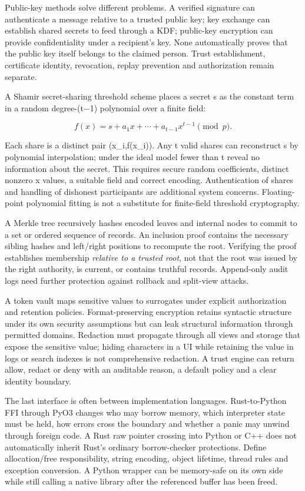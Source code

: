 Public-key methods solve different problems. A verified signature can authenticate a message relative to a trusted public key; key exchange can establish shared secrets to feed through a KDF; public-key encryption can provide confidentiality under a recipient's key. None automatically proves that the public key itself belongs to the claimed person. Trust establishment, certificate identity, revocation, replay prevention and authorization remain separate.

A Shamir secret-sharing threshold scheme places a secret s as the constant term in a random degree-(t−1) polynomial over a finite field:

\[
f(x)=s+a_1x+\cdots+a_{t-1}x^{t-1}\pmod p.
\]

Each share is a distinct pair (x\_i,f(x\_i)). Any t valid shares can reconstruct s by polynomial interpolation; under the ideal model fewer than t reveal no information about the secret. This requires secure random coefficients, distinct nonzero x values, a suitable field and correct encoding. Authentication of shares and handling of dishonest participants are additional system concerns. Floating-point polynomial fitting is not a substitute for finite-field threshold cryptography.

A Merkle tree recursively hashes encoded leaves and internal nodes to commit to a set or ordered sequence of records. An inclusion proof contains the necessary sibling hashes and left/right positions to recompute the root. Verifying the proof establishes membership \emph{relative to a trusted root}, not that the root was issued by the right authority, is current, or contains truthful records. Append-only audit logs need further protection against rollback and split-view attacks.

A token vault maps sensitive values to surrogates under explicit authorization and retention policies. Format-preserving encryption retains syntactic structure under its own security assumptions but can leak structural information through permitted domains. Redaction must propagate through all views and storage that expose the sensitive value; hiding characters in a UI while retaining the value in logs or search indexes is not comprehensive redaction. A trust engine can return allow, redact or deny with an auditable reason, a default policy and a clear identity boundary.

The last interface is often between implementation languages. Rust-to-Python FFI through PyO3 changes who may borrow memory, which interpreter state must be held, how errors cross the boundary and whether a panic may unwind through foreign code. A Rust raw pointer crossing into Python or C++ does not automatically inherit Rust's ordinary borrow-checker protections. Define allocation/free responsibility, string encoding, object lifetime, thread rules and exception conversion. A Python wrapper can be memory-safe on its own side while still calling a native library after the referenced buffer has been freed.

